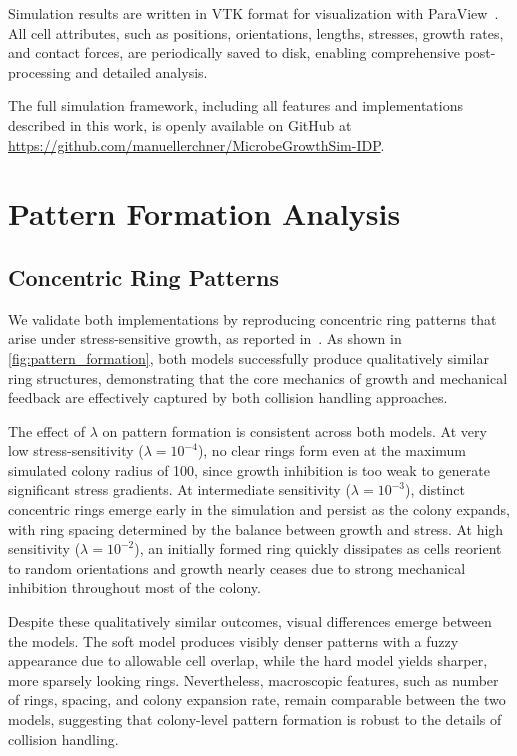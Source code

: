 \documentclass[conference]{IEEEtran}
\begin{document}
Simulation results are written in VTK format for visualization with ParaView~\cite{ahrens2005paraview}. All cell attributes, such as positions, orientations, lengths, stresses, growth rates, and contact forces, are periodically saved to disk, enabling comprehensive post-processing and detailed analysis.

The full simulation framework, including all features and implementations described in this work, is openly available on GitHub at \url{https://github.com/manuellerchner/MicrobeGrowthSim-IDP}.

\newpage

\section{Pattern Formation Analysis}

\subsection{Concentric Ring Patterns}

We validate both implementations by reproducing concentric ring patterns that arise under stress-sensitive growth, as reported in~\cite{Weady2024}. As shown in \autoref{fig:pattern_formation}, both models successfully produce qualitatively similar ring structures, demonstrating that the core mechanics of growth and mechanical feedback are effectively captured by both collision handling approaches.

The effect of $\lambda$ on pattern formation is consistent across both models. At very low stress-sensitivity ($\lambda = 10^{-4}$), no clear rings form even at the maximum simulated colony radius of 100, since growth inhibition is too weak to generate significant stress gradients. At intermediate sensitivity ($\lambda = 10^{-3}$), distinct concentric rings emerge early in the simulation and persist as the colony expands, with ring spacing determined by the balance between growth and stress. At high sensitivity ($\lambda = 10^{-2}$), an initially formed ring quickly dissipates as cells reorient to random orientations and growth nearly ceases due to strong mechanical inhibition throughout most of the colony.

Despite these qualitatively similar outcomes, visual differences emerge between the models. The soft model produces visibly denser patterns with a fuzzy appearance due to allowable cell overlap, while the hard model yields sharper, more sparsely looking rings. Nevertheless, macroscopic features, such as number of rings, spacing, and colony expansion rate, remain comparable between the two models, suggesting that colony-level pattern formation is robust to the details of collision handling.
\end{document}
